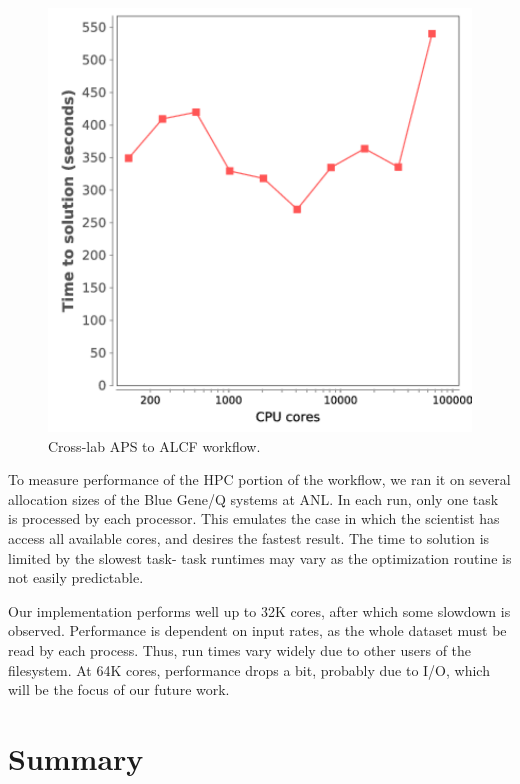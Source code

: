 \documentclass[conference,10pt]{IEEEtran}
\begin{document}
\begin{figure}
  \begin{center}
    \includegraphics[scale=0.58,clip=true,trim=0.05in -0.3in 0 0]
                    {plots/nf-hedm.pdf}
    \caption{Cross-lab APS to ALCF workflow.
      \label{figure:nfhedm-workflow}}
  \end{center}
\end{figure}

To measure performance of the HPC portion of the workflow, we ran it
on several allocation sizes of the Blue Gene/Q systems at ANL.  In
each run, only one task is processed by each processor.  This emulates
the case in which the scientist has access all available cores, and
desires the fastest result.  The time to solution is limited by the
slowest task- task runtimes may vary as the optimization routine is
not easily predictable.  

Our implementation performs well up to 32K cores, after which some
slowdown is observed.  Performance is dependent on input rates, as the
whole dataset must be read by each process.  Thus, run times vary
widely due  to other users of the filesystem.  At 64K cores,
performance drops a bit, probably due to I/O, which will be the focus
of our future work.  

\section{Summary}
\end{document}
